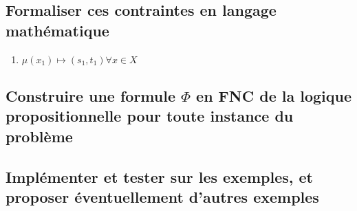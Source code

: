 \documentclass[a4paper]{article}
\begin{document}
\subsection{Formaliser ces contraintes en langage mathématique}
\begin{enumerate}
  \item $\mu(x_1) \mapsto (s_1,t_1) \forall x \in X$
\end{enumerate}

\subsection{Construire une formule $\Phi$ en FNC de la logique propositionnelle pour toute instance du problème}

\subsection{Implémenter et tester sur les exemples, et proposer éventuellement d’autres exemples}

\end{document}

